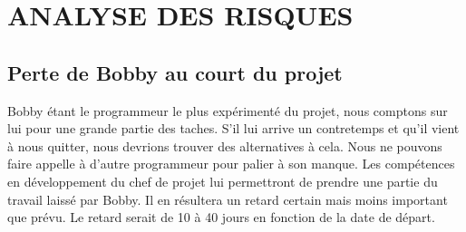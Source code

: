 \documentclass[]{scrartcl}
\begin{document}
\section{ANALYSE DES RISQUES}
\subsection{Perte de Bobby au court du projet}
Bobby étant le programmeur le plus expérimenté du projet, nous comptons sur lui pour une grande partie des taches. S’il lui arrive un contretemps et qu’il vient à nous quitter, nous devrions trouver des alternatives à cela. Nous ne pouvons faire appelle à d’autre programmeur pour palier à son manque. Les compétences en développement du chef de projet lui permettront de prendre une partie du travail laissé par Bobby. Il en résultera un retard certain mais moins important que prévu. Le retard serait de 10 à 40 jours en fonction de la date de départ.


\begin{appendices}
\end{appendices}
\end{document}
